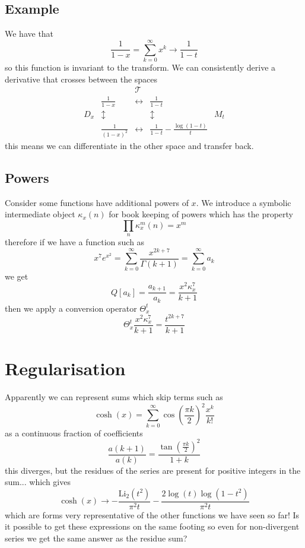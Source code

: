 \documentclass{article}
\begin{document}
\subsection{Example}
We have that
$$
\frac{1}{1-x} = \sum_{k=0}^\infty x^k \to \frac{1}{1-t}
$$
so this function is invariant to the transform. We can consistently derive a derivative that crosses between the spaces
\begin{equation}
\begin{matrix}
 &      & \mathcal{T} & \\
 & \frac{1}{1-x} & \leftrightarrow & \frac{1}{1-t} &\\
 D_x & \updownarrow & & \updownarrow & M_t\\
 & \frac{1}{(1-x)^2} & \leftrightarrow & \frac{1}{1-t} - \frac{\log(1-t)}{t}
\end{matrix}
\end{equation}
this means we can differentiate in the other space and transfer back. 

\subsection{Powers}
Consider some functions have additional powers of $x$. We introduce a symbolic intermediate object $\kappa_x(n)$ for book keeping of powers which has the property
$$
\prod_{n} \kappa_x^m(n) = x^m
$$
therefore if we have a function such as 
$$
x^7 e^{x^2} = \sum_{k=0}^\infty \frac{x^{2k+7}}{\Gamma(k+1)} = \sum_{k=0}^\infty a_k
$$
we get 
$$
Q[a_k]= \frac{a_{k+1}}{a_k} = \frac{x^2 \kappa_x^7}{k+1}
$$
then we apply a conversion operator $\Theta_x^t$
$$
\Theta_x^t \frac{x^2 \kappa_x^7}{k+1} = \frac{t^{2k+7}}{k+1}
$$


\section{Regularisation}
Apparently we can represent sums which skip terms such as
$$
\cosh(x) = \sum_{k=0}^\infty \cos(\frac{\pi k}{2})^2 \frac{x^k}{k!}
$$
as a continuous fraction of coefficients
$$
\frac{a(k+1)}{a(k)} = \frac{\tan(\frac{\pi k}{2})^2}{1+k}
$$
this diverges, but the residues of the series are present for positive integers in the sum... which gives 
$$
\cosh(x) \to - \frac{\mathrm{Li}_2(t^2)}{\pi^2 t} - \frac{2 \log(t) \log(1-t^2)}{\pi^2 t}
$$
which are forms very representative of the other functions we have seen so far! Is it possible to get these expressions on the same footing so even for non-divergent series we get the same answer as the residue sum?
\end{document}
